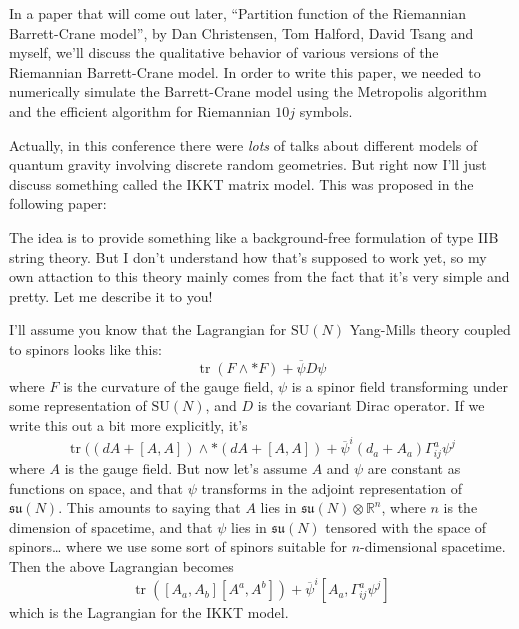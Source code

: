 \documentclass{article}
\def\tightlist{}
\renewcommand{\texttt}[1]{%
  \begingroup
  \ttfamily
  \begingroup\lccode`~=`/\lowercase{\endgroup\def~}{/\discretionary{}{}{}}%
  \begingroup\lccode`~=`[\lowercase{\endgroup\def~}{[\discretionary{}{}{}}%
  \begingroup\lccode`~=`.\lowercase{\endgroup\def~}{.\discretionary{}{}{}}%
  \catcode`/=\active\catcode`[=\active\catcode`.=\active
  \scantokens{#1\noexpand}%
  \endgroup
}
\begin{document}
In a paper that will come out later, ``Partition function of the
Riemannian Barrett-Crane model'', by Dan Christensen, Tom Halford, David
Tsang and myself, we'll discuss the qualitative behavior of various
versions of the Riemannian Barrett-Crane model. In order to write this
paper, we needed to numerically simulate the Barrett-Crane model using
the Metropolis algorithm and the efficient algorithm for Riemannian
\(10j\) symbols.

Actually, in this conference there were \emph{lots} of talks about
different models of quantum gravity involving discrete random
geometries. But right now I'll just discuss something called the IKKT
matrix model. This was proposed in the following paper:


The idea is to provide something like a background-free formulation of
type IIB string theory. But I don't understand how that's supposed to
work yet, so my own attaction to this theory mainly comes from the fact
that it's very simple and pretty. Let me describe it to you!

I'll assume you know that the Lagrangian for \(\mathrm{SU}(N)\)
Yang-Mills theory coupled to spinors looks like this:
\[\operatorname{tr}(F\wedge *F) + \overline{\psi} D \psi\] where \(F\)
is the curvature of the gauge field, \(\psi\) is a spinor field
transforming under some representation of \(\mathrm{SU}(N)\), and \(D\)
is the covariant Dirac operator. If we write this out a bit more
explicitly, it's
\[\operatorname{tr}((dA + [A,A]) \wedge *(dA + [A,A]) + \overline{\psi}^i (d_a+A_a) \Gamma^a_{ij} \psi^j\]
where \(A\) is the gauge field. But now let's assume \(A\) and \(\psi\)
are constant as functions on space, and that \(\psi\) transforms in the
adjoint representation of \(\mathfrak{su}(N)\). This amounts to saying
that \(A\) lies in \(\mathfrak{su}(N)\otimes\mathbb{R}^n\), where \(n\)
is the dimension of spacetime, and that \(\psi\) lies in
\(\mathfrak{su}(N)\) tensored with the space of spinors\ldots{} where we
use some sort of spinors suitable for \(n\)-dimensional spacetime. Then
the above Lagrangian becomes
\[\operatorname{tr}([A_a,A_b] [A^a,A^b]) + \overline{\psi}^i [A_a, \Gamma^a_{ij}\psi^j]\]
which is the Lagrangian for the IKKT model.
\end{document}

